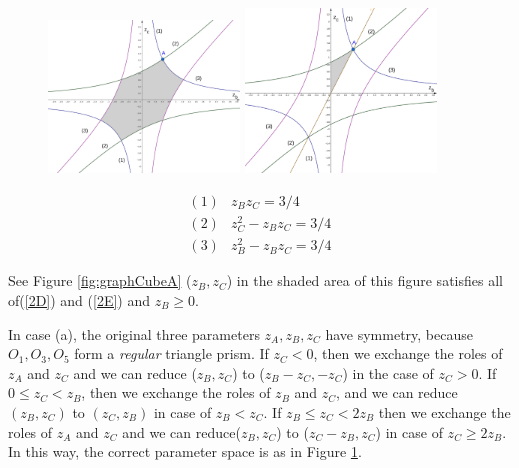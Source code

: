 \documentclass[suppldata, dvipdfmx]{interact}
\theoremstyle{plain}%
\theoremstyle{definition}
\theoremstyle{remark}
\theoremstyle{problemstyle}
\begin{document}
\begin{figure}[h!tbp]
 \begin{minipage}[t]{0.5\textwidth}
 \centering
 \includegraphics[width=2in,
 keepaspectratio]{./img/graph/cubeA.png}
 \caption{}
 \label{fig:graphCubeA}
 \end{minipage}
 \hspace*{\fill}
 \begin{minipage}[t]{0.5\textwidth}
  \centering
  \includegraphics[width=2in,
  keepaspectratio]{./img/graph/cubeALimit.png}
  \caption{}
  \label{fig:graphCubeALimit}
 \end{minipage}
 \hspace*{\fill}
\end{figure}

\begin{align*}
(1)& z_Bz_C = 3/4\\
(2)& z_C^2 - z_B z_C = 3/4\\
(3)& z_B^2 - z_B z_C = 3/4
\end{align*}

See Figure \ref{fig:graphCubeA} ($z_B, z_C$) in the shaded area of this figure satisfies
all of(\ref{2D}) and (\ref{2E}) and $z_B \geq 0$.

In case (a), the original three parameters $z_A, z_B, z_C$ have symmetry,
because $O_1, O_3, O_5$ form a \textit{regular} triangle prism.
If $z_C < 0$, then we exchange the roles of $z_A$ and $z_C$ and we can reduce
($z_B, z_C$) to ($z_B - z_C, -z_C$) in the case of $z_C > 0$.
If $0 \leq z_C < z_B$, then we exchange the roles of $z_B$ and $z_C$, 
and we can reduce $(z_B, z_C)$ to $(z_C, z_B)$ in case of 
$z_B < z_C$. If $z_B \leq z_C < 2z_B$ then we exchange the roles of
$z_A$ and $z_C$ and we can reduce($z_B, z_C$) to ($z_C-z_B,z_C$) in case
of $z_C \geq 2z_B$. In this way, the correct parameter space is as in
Figure \ref{fig:graphCubeALimit}.
\end{document}
